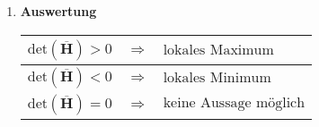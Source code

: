 \begin{enumerate}[itemsep=1ex]
    \item \textbf{Auswertung}\\
    \begin{tabular}{lll}
        \hline
        $\text{det}\left(\overline{\mathbf{H}}\right) > 0$ &$\Longrightarrow$& $\text{lokales Maximum}$\\
        \hline
        $\text{det}\left(\overline{\mathbf{H}}\right) < 0$ &$\Longrightarrow$& $\text{lokales Minimum}$\\
        \hline
        $\text{det}\left(\overline{\mathbf{H}}\right) = 0$ &$\Longrightarrow$& $\text{keine Aussage möglich}$\\
        \hline
    \end{tabular}

\end{enumerate}